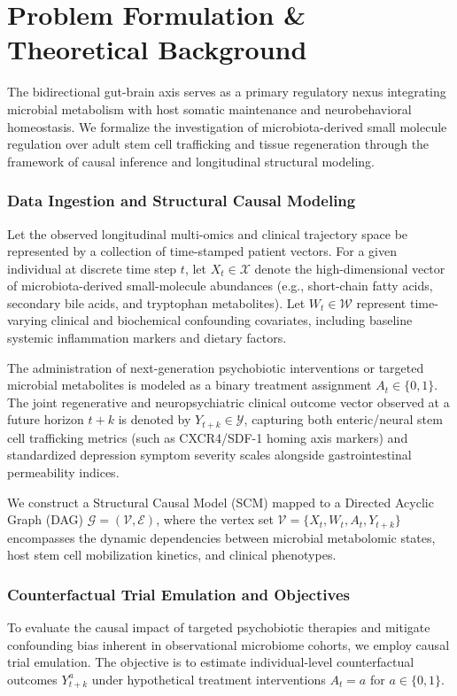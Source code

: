 \documentclass[10pt,twocolumn]{article}
\begin{document}
\section{Problem Formulation \& Theoretical Background}
The bidirectional gut-brain axis serves as a primary regulatory nexus integrating microbial metabolism with host somatic maintenance and neurobehavioral homeostasis. We formalize the investigation of microbiota-derived small molecule regulation over adult stem cell trafficking and tissue regeneration through the framework of causal inference and longitudinal structural modeling.

\subsubsection{Data Ingestion and Structural Causal Modeling}
Let the observed longitudinal multi-omics and clinical trajectory space be represented by a collection of time-stamped patient vectors. For a given individual at discrete time step $t$, let $X_t \in \mathcal{X}$ denote the high-dimensional vector of microbiota-derived small-molecule abundances (e.g., short-chain fatty acids, secondary bile acids, and tryptophan metabolites). Let $W_t \in \mathcal{W}$ represent time-varying clinical and biochemical confounding covariates, including baseline systemic inflammation markers and dietary factors. 

The administration of next-generation psychobiotic interventions or targeted microbial metabolites is modeled as a binary treatment assignment $A_t \in \{0, 1\}$. The joint regenerative and neuropsychiatric clinical outcome vector observed at a future horizon $t+k$ is denoted by $Y_{t+k} \in \mathcal{Y}$, capturing both enteric/neural stem cell trafficking metrics (such as CXCR4/SDF-1 homing axis markers) and standardized depression symptom severity scales alongside gastrointestinal permeability indices. 

We construct a Structural Causal Model (SCM) mapped to a Directed Acyclic Graph (DAG) $\mathcal{G} = (\mathcal{V}, \mathcal{E})$, where the vertex set $\mathcal{V} = \{X_t, W_t, A_t, Y_{t+k}\}$ encompasses the dynamic dependencies between microbial metabolomic states, host stem cell mobilization kinetics, and clinical phenotypes.

\subsubsection{Counterfactual Trial Emulation and Objectives}
To evaluate the causal impact of targeted psychobiotic therapies and mitigate confounding bias inherent in observational microbiome cohorts, we employ causal trial emulation. The objective is to estimate individual-level counterfactual outcomes $Y_{t+k}^{a}$ under hypothetical treatment interventions $A_t = a$ for $a \in \{0, 1\}$. 
\end{document}
